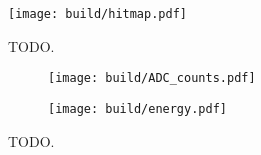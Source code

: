 \begin{figure}[H]
  \centering
  \texttt{[image: build/hitmap.pdf]}
  \caption{TODO.}
  \label{fig:hitmap}
\end{figure}

\begin{figure}[H]
  \centering
    \begin{subfigure}{0.5\textwidth}
      \texttt{[image: build/ADC\_counts.pdf]}
    \end{subfigure}
    \begin{subfigure}{0.5\textwidth}
      \texttt{[image: build/energy.pdf]}
    \end{subfigure}
  \caption{TODO.}
  \label{fig:RS_distributions}
\end{figure}